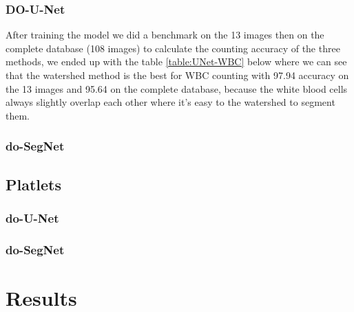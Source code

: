 

\subsubsection{DO-U-Net}
After training the model we did a benchmark on the 13 images then on the complete database (108 images) to calculate the counting accuracy of the three methods, we ended up with the table \ref{table:UNet-WBC} below where we can see that the watershed method is the best for WBC counting with 97.94 accuracy on the 13 images and 95.64 on the complete database, because the white blood cells always slightly overlap each other where it's easy to the watershed to segment them.



\subsubsection{do-SegNet}

% 

\subsection{Platlets}
\subsubsection{do-U-Net}
\subsubsection{do-SegNet}

% 


\section{Results}
\vspace{0.2in}
\hspace*{0.16in}



